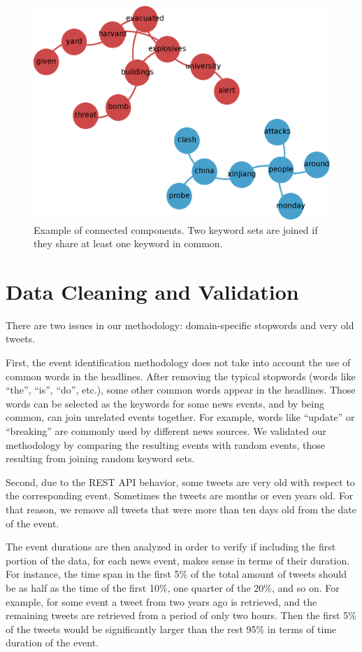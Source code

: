 \begin{figure}
    \centering
    \includegraphics[width=.6\textwidth]{figures/data/connected_components.eps}
    \caption[Example of connected components]
    {Example of connected components. Two keyword sets are joined if they share
    at least one keyword in common.}\label{fig:connected-component}
\end{figure}



\section{Data Cleaning and Validation}\label{sec:cleaning}

There are two issues in our methodology: domain-specific stopwords and very old
tweets.

First, the event identification methodology does not take into account the use
of common words in the headlines. 
%
After removing the typical stopwords (words like ``the'', ``is'', ``do'', etc.),
some other common words appear in the headlines. 
%
Those words can be selected as the keywords for some news events, and by being
common, can join unrelated events together.
%
For example, words like ``update'' or ``breaking'' are commonly used by
different news sources. 
%
We validated our methodology by comparing the resulting events with random
events, those resulting from joining random keyword sets.

Second, due to the REST API behavior, some tweets are very old with respect to
the corresponding event. 
%
Sometimes the tweets are months or even years old. 
%
For that reason, we remove all tweets that were more than ten days old from the
date of the event. 

The event durations are then analyzed in order to verify if including the first
portion of the data, for each news event, makes sense in terms of their
duration. 
%
For instance, the time span in the first 5\% of the total amount of tweets
should be as half as the time of the first 10\%, one quarter of the 20\%, and so
on. 
%
For example, for some event a tweet from two years ago is retrieved, and the
remaining tweets are retrieved from a period of only two hours. 
%
Then the first 5\% of the tweets would be significantly larger than the rest
95\% in terms of time duration of the event. 



